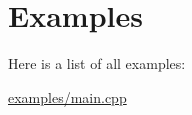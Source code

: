 \section{Examples}
Here is a list of all examples:\begin{DoxyCompactItemize}
\item 
\hyperlink{examples_2main_8cpp-example}{examples/main.cpp}
\end{DoxyCompactItemize}
